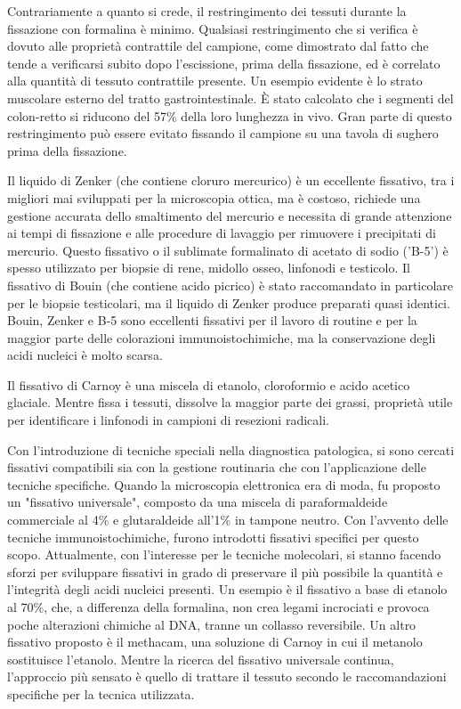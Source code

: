 Contrariamente a quanto si crede, il restringimento dei tessuti durante la fissazione con formalina è minimo. Qualsiasi restringimento che si verifica è dovuto alle proprietà contrattile del campione, come dimostrato dal fatto che tende a verificarsi subito dopo l'escissione, prima della fissazione, ed è correlato alla quantità di tessuto contrattile presente. Un esempio evidente è lo strato muscolare esterno del tratto gastrointestinale. È stato calcolato che i segmenti del colon-retto si riducono del 57\% della loro lunghezza in vivo. Gran parte di questo restringimento può essere evitato fissando il campione su una tavola di sughero prima della fissazione.

Il liquido di Zenker (che contiene cloruro mercurico) è un eccellente fissativo, tra i migliori mai sviluppati per la microscopia ottica, ma è costoso, richiede una gestione accurata dello smaltimento del mercurio e necessita di grande attenzione ai tempi di fissazione e alle procedure di lavaggio per rimuovere i precipitati di mercurio. Questo fissativo o il sublimate formalinato di acetato di sodio ('B-5') è spesso utilizzato per biopsie di rene, midollo osseo, linfonodi e testicolo. Il fissativo di Bouin (che contiene acido picrico) è stato raccomandato in particolare per le biopsie testicolari, ma il liquido di Zenker produce preparati quasi identici. Bouin, Zenker e B-5 sono eccellenti fissativi per il lavoro di routine e per la maggior parte delle colorazioni immunoistochimiche, ma la conservazione degli acidi nucleici è molto scarsa.

Il fissativo di Carnoy è una miscela di etanolo, cloroformio e acido acetico glaciale. Mentre fissa i tessuti, dissolve la maggior parte dei grassi, proprietà utile per identificare i linfonodi in campioni di resezioni radicali.

Con l'introduzione di tecniche speciali nella diagnostica patologica, si sono cercati fissativi compatibili sia con la gestione routinaria che con l'applicazione delle tecniche specifiche. Quando la microscopia elettronica era di moda, fu proposto un "fissativo universale", composto da una miscela di paraformaldeide commerciale al 4\% e glutaraldeide all'1\% in tampone neutro. Con l'avvento delle tecniche immunoistochimiche, furono introdotti fissativi specifici per questo scopo. Attualmente, con l'interesse per le tecniche molecolari, si stanno facendo sforzi per sviluppare fissativi in grado di preservare il più possibile la quantità e l'integrità degli acidi nucleici presenti. Un esempio è il fissativo a base di etanolo al 70\%, che, a differenza della formalina, non crea legami incrociati e provoca poche alterazioni chimiche al DNA, tranne un collasso reversibile. Un altro fissativo proposto è il methacam, una soluzione di Carnoy in cui il metanolo sostituisce l'etanolo. Mentre la ricerca del fissativo universale continua, l'approccio più sensato è quello di trattare il tessuto secondo le raccomandazioni specifiche per la tecnica utilizzata.

